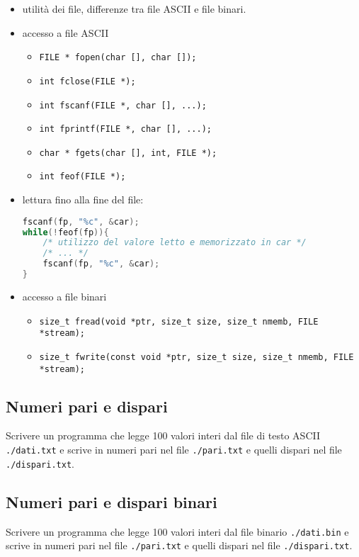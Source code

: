 \begin{itemize}
\item utilit\`a dei file, differenze tra file ASCII e file binari.
\item accesso a file ASCII
    \begin{itemize}
    \item \texttt{FILE * fopen(char [], char []);}
    \item \texttt{int fclose(FILE *);}
    \item \texttt{int fscanf(FILE *, char [], ...);}
    \item \texttt{int fprintf(FILE *, char [], ...);}
    \item \texttt{char * fgets(char [], int, FILE *);}
    \item \texttt{int feof(FILE *);}
    \end{itemize}
\item lettura fino alla fine del file:
\begin{lstlisting}[language=c]
fscanf(fp, "%c", &car);
while(!feof(fp)){
	/* utilizzo del valore letto e memorizzato in car */
	/* ... */
	fscanf(fp, "%c", &car);
}
\end{lstlisting}
\item accesso a file binari
	\begin{itemize}
	\item \texttt{size\_t fread(void *ptr, size\_t size, size\_t nmemb, FILE *stream);}
	\item \texttt{size\_t fwrite(const void *ptr, size\_t size, size\_t nmemb, FILE *stream);}
	\end{itemize}
\end{itemize}


\subsection{Numeri pari e dispari}

Scrivere un programma che legge 100 valori interi dal file di testo ASCII \texttt{./dati.txt} e scrive in numeri pari nel file \texttt{./pari.txt} e quelli dispari nel file \texttt{./dispari.txt}. 


\subsection{Numeri pari e dispari binari}

Scrivere un programma che legge 100 valori interi dal file binario \texttt{./dati.bin} e scrive in numeri pari nel file \texttt{./pari.txt} e quelli dispari nel file \texttt{./dispari.txt}. 

